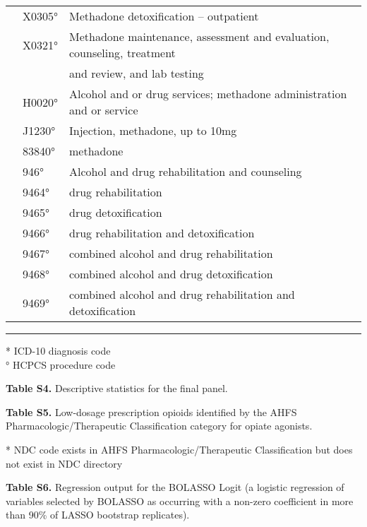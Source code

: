 \documentclass[10pt, letter]{article}
\begin{document}
\begin{tabular}{lll}
 & X0305° & Methadone detoxification – outpatient \\
 & X0321° & Methadone maintenance, assessment and evaluation, counseling, treatment \\
 &  & and review, and lab testing \\
 & H0020° & Alcohol and or drug services; methadone administration and or service \\
 & J1230° & Injection, methadone, up to 10mg \\
 & 83840° & methadone \\
 & 946° & Alcohol and drug rehabilitation and counseling \\
 & 9464° & drug rehabilitation \\
 & 9465° & drug detoxification \\
 & 9466° & drug rehabilitation and detoxification \\
 & 9467° & combined alcohol and drug rehabilitation \\
 & 9468° & combined alcohol and drug detoxification \\
 & 9469° & combined alcohol and drug rehabilitation and detoxification \\[1em]
\end{tabular}

\hrule

\footnotesize
* ICD-10 diagnosis code \\
° HCPCS procedure code
\normalsize

\newpage

\textbf{Table S4.} Descriptive statistics for the final panel.



\newpage

\textbf{Table S5.} Low-dosage prescription opioids identified by the AHFS Pharmacologic/Therapeutic Classification category for opiate agonists.

\tiny


* NDC code exists in AHFS Pharmacologic/Therapeutic Classification but does not exist in NDC directory
\normalsize

\newpage

\textbf{Table S6.} Regression output for the BOLASSO Logit (a logistic regression of variables selected by BOLASSO as occurring with a non-zero coefficient in more than 90\% of LASSO bootstrap replicates).

\tiny

\normalsize
\end{document}
